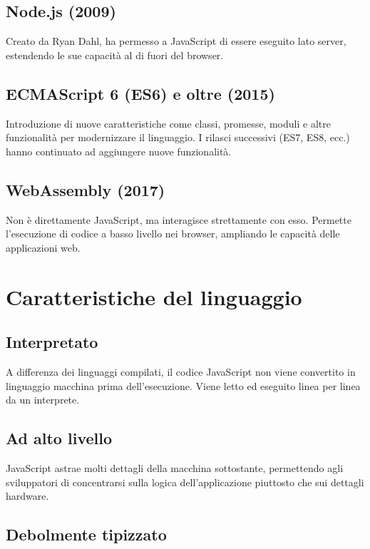\subsection{Node.js (2009)}

Creato da Ryan Dahl, ha permesso a JavaScript di essere eseguito lato server, estendendo le sue capacità al di fuori del browser.

\subsection{ECMAScript 6 (ES6) e oltre (2015)}

Introduzione di nuove caratteristiche come classi, promesse, moduli e altre funzionalità per modernizzare il linguaggio. I rilasci successivi (ES7, ES8, ecc.) hanno continuato ad aggiungere nuove funzionalità.

\subsection{WebAssembly (2017)}

Non è direttamente JavaScript, ma interagisce strettamente con esso. Permette l'esecuzione di codice a basso livello nei browser, ampliando le capacità delle applicazioni web.

\section{Caratteristiche del linguaggio}

\subsection{Interpretato}

A differenza dei linguaggi compilati, il codice JavaScript non viene convertito in linguaggio macchina prima dell'esecuzione. Viene letto ed eseguito linea per linea da un interprete.

\subsection{Ad alto livello}

JavaScript astrae molti dettagli della macchina sottostante, permettendo agli sviluppatori di concentrarsi sulla logica dell'applicazione piuttosto che sui dettagli hardware.

\subsection{Debolmente tipizzato}

